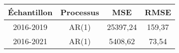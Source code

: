 \begin{tabular}{cccc}
\toprule
Échantillon & Processus& MSE   & RMSE \\
\midrule
2016-2019 &AR(1)& 25397,24 & 159,37 \\
2016-2021 &AR(1)& 5408,62 & 73,54 \\
\bottomrule
\end{tabular}%
